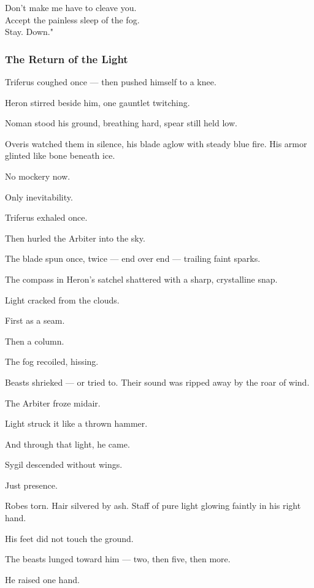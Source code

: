 \documentclass[12pt]{article}
\begin{document}
Don't make me have to cleave you.\\

Accept the painless sleep of the fog.\\

Stay. Down."

\dotfill

\subsubsection{The Return of the Light}
Triferus coughed once — then pushed himself to a knee.

Heron stirred beside him, one gauntlet twitching.

Noman stood his ground, breathing hard, spear still held low.

Overis watched them in silence, his blade aglow with steady blue fire. His armor glinted like bone beneath ice.

No mockery now.

Only inevitability.

\bigskip

Triferus exhaled once.

Then hurled the Arbiter into the sky.

The blade spun once, twice — end over end — trailing faint sparks.

The compass in Heron’s satchel shattered with a sharp, crystalline snap.

Light cracked from the clouds.

First as a seam.

Then a column.

The fog recoiled, hissing.

Beasts shrieked — or tried to. Their sound was ripped away by the roar of wind.

The Arbiter froze midair.

Light struck it like a thrown hammer.

And through that light, he came.

\bigskip

Sygil descended without wings.

Just presence.

Robes torn. Hair silvered by ash. Staff of pure light glowing faintly in his right hand.

His feet did not touch the ground.

The beasts lunged toward him — two, then five, then more.

He raised one hand.
\end{document}
